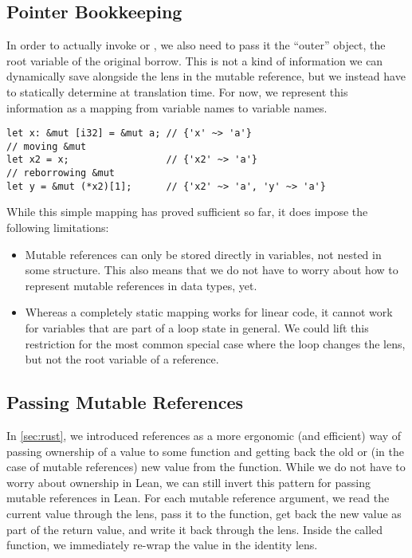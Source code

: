 \subsection{Pointer Bookkeeping}
\label{sec:book}

In order to actually invoke  or , we also need to
pass it the ``outer'' object, \ie the root variable of the original borrow. This
is not a kind of information we can dynamically save alongside the lens in the
mutable reference, but we instead have to statically determine at translation
time. For now, we represent this information as a mapping from variable names to
variable names.

\begin{verbatim}
let x: &mut [i32] = &mut a; // {'x' ~> 'a'}
// moving &mut
let x2 = x;                 // {'x2' ~> 'a'}
// reborrowing &mut
let y = &mut (*x2)[1];      // {'x2' ~> 'a', 'y' ~> 'a'}
\end{verbatim}

While this simple mapping has proved sufficient so far, it does impose
the following limitations:

\begin{itemize}
\item Mutable references can only be stored directly in variables, not nested in
  some structure. This also means that we do not have to worry about how to
  represent mutable references in data types, yet.
\item Whereas a completely static mapping works for linear code, it cannot work
  for variables that are part of a loop state in general. We could lift this
  restriction for the most common special case where the loop changes the lens,
  but not the root variable of a reference.
\end{itemize}

\subsection{Passing Mutable References}
\label{sec:passable}

In \autoref{sec:rust}, we introduced references as a more ergonomic (and
efficient) way of passing ownership of a value to some function and getting back the
old or (in the case of mutable references) new value from the function. While we
do not have to worry about ownership in Lean, we can still invert this pattern
for passing mutable references in Lean. For each mutable reference argument, we
read the current value through the lens, pass it to the function, get back the new
value as part of the return value, and write it back through the lens. Inside
the called function, we immediately re-wrap the value in the identity lens.

